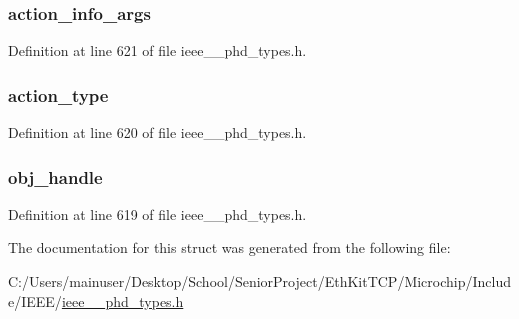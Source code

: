 \subsubsection[{action\+\_\+info\+\_\+args}]{ action\+\_\+info\+\_\+args}\label{struct___action_argument_simple_aa60d83842c341dc10b70484bfb38634c}


Definition at line 621 of file ieee\+\_\+\_\+phd\+\_\+types.\+h.

\hypertarget{struct___action_argument_simple_aa7cb846e240dc56bd1c2fcc0ee736fd5}{}
\subsubsection[{action\+\_\+type}]{ action\+\_\+type}\label{struct___action_argument_simple_aa7cb846e240dc56bd1c2fcc0ee736fd5}


Definition at line 620 of file ieee\+\_\+\_\+phd\+\_\+types.\+h.

\hypertarget{struct___action_argument_simple_abbfff52b7a4956021522f5750c4b32c6}{}
\subsubsection[{obj\+\_\+handle}]{ obj\+\_\+handle}\label{struct___action_argument_simple_abbfff52b7a4956021522f5750c4b32c6}


Definition at line 619 of file ieee\+\_\+\_\+phd\+\_\+types.\+h.



The documentation for this struct was generated from the following file\+:\begin{DoxyCompactItemize}
\item 
C\+:/\+Users/mainuser/\+Desktop/\+School/\+Senior\+Project/\+Eth\+Kit\+T\+C\+P/\+Microchip/\+Include/\+I\+E\+E\+E/\hyperlink{ieee__11073__phd__types_8h}{ieee\+\_\+\_\+phd\+\_\+types.\+h}\end{DoxyCompactItemize}
